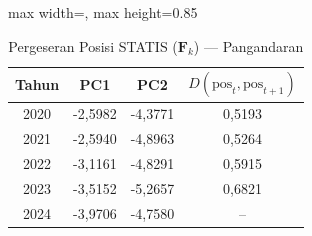 \begin{table}[H]
\centering
\caption{Pergeseran Posisi STATIS ($\mathbf{F}_k$) --- Pangandaran} \label{tab:app1jarak_statis_skor_pangandaran}
\begin{adjustbox}{max width=\textwidth, max height=0.85\textheight}
\begin{tabular}{|c|c|c|c|}
\hline
\textbf{Tahun} & \textbf{PC1} & \textbf{PC2} & \textbf{$D(\text{pos}_t, \text{pos}_{t+1})$} \\
\hline
2020 & -2,5982 & -4,3771 & 0,5193 \\
2021 & -2,5940 & -4,8963 & 0,5264 \\
2022 & -3,1161 & -4,8291 & 0,5915 \\
2023 & -3,5152 & -5,2657 & 0,6821 \\
2024 & -3,9706 & -4,7580 & -- \\
\hline
\end{tabular}
\end{adjustbox}
\end{table}